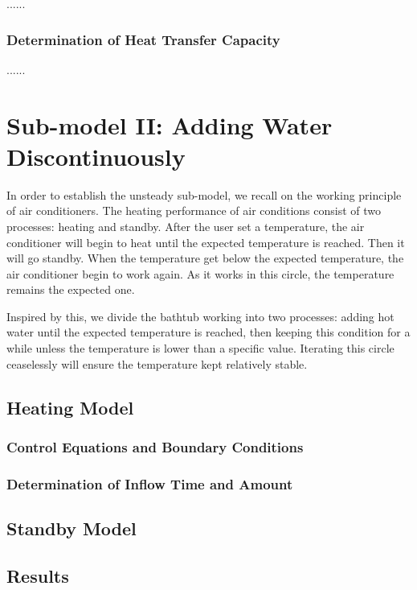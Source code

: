 ......

\subsubsection{Determination of Heat Transfer Capacity}

......

\section{Sub-model II: Adding Water Discontinuously}

In order to establish the unsteady sub-model, we recall on the working principle of air conditioners. The heating performance of air conditions consist of two processes: heating and standby. After the user set a temperature, the air conditioner will begin to heat until the expected temperature is reached. Then it will go standby. When the temperature get below the expected temperature, the air conditioner begin to work again. As it works in this circle, the temperature remains the expected one.

Inspired by this, we divide the bathtub working into two processes: adding
hot water until the expected temperature is reached, then keeping this
condition for a while unless the temperature is lower than a specific value. Iterating this circle ceaselessly will ensure the temperature kept relatively stable.

\subsection{Heating Model}

\subsubsection{Control Equations and Boundary Conditions}

\subsubsection{Determination of Inflow Time and Amount}

\subsection{Standby Model}

\subsection{Results}

